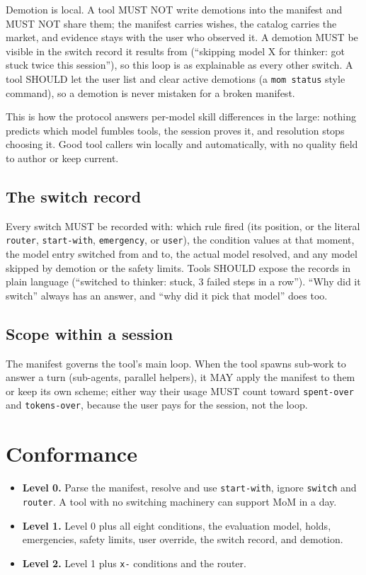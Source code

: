 \documentclass[11pt]{article}
\newcommand{\key}[1]{\texttt{#1}}
\begin{document}
Demotion is local. A tool MUST NOT write demotions into the manifest and
MUST NOT share them; the manifest carries wishes, the catalog carries
the market, and evidence stays with the user who observed it. A demotion
MUST be visible in the switch record it results from (``skipping model X
for thinker: got stuck twice this session''), so this loop is as
explainable as every other switch. A tool SHOULD let the user list and
clear active demotions (a \key{mom status} style command), so a demotion
is never mistaken for a broken manifest.

This is how the protocol answers per-model skill differences in the
large: nothing predicts which model fumbles tools, the session proves
it, and resolution stops choosing it. Good tool callers win locally and
automatically, with no quality field to author or keep current.

\subsection{The switch record}
\label{sec:record}

Every switch MUST be recorded with: which rule fired (its position, or
the literal \key{router}, \key{start-with}, \key{emergency}, or \key{user}),
the condition values at that moment, the model entry switched from and to,
the actual model resolved, and any model skipped by demotion or the
safety limits. Tools SHOULD expose the records in plain language
(``switched to thinker: stuck, 3 failed steps in a row''). ``Why did it
switch'' always has an answer, and ``why did it pick that model'' does too.

\subsection{Scope within a session}

The manifest governs the tool's main loop. When the tool spawns sub-work
to answer a turn (sub-agents, parallel helpers), it MAY apply the
manifest to them or keep its own scheme; either way their usage MUST
count toward \key{spent-over} and \key{tokens-over}, because the user pays
for the session, not the loop.

\section{Conformance}
\label{sec:conformance}

\begin{itemize}
  \item \textbf{Level 0.} Parse the manifest, resolve and use
        \key{start-with}, ignore \key{switch} and \key{router}. A tool with
        no switching machinery can support MoM in a day.
  \item \textbf{Level 1.} Level 0 plus all eight conditions, the evaluation
        model, holds, emergencies, safety limits, user override, the switch
        record, and demotion.
  \item \textbf{Level 2.} Level 1 plus \key{x-} conditions and the router.
\end{itemize}
\end{document}
